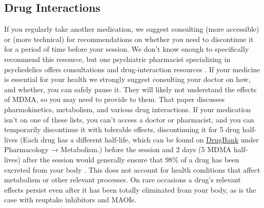 \documentclass[12pt,letterpaper]{book}
\begin{document}
\subsection*{Drug Interactions}
If you regularly take another medication, we suggest consulting \textcite{liechtiInteractions} (more accessible) or \textcite{sarparastDrugInteractions} (more technical) for recommendations on whether you need to discontinue it for a period of time before your session. We don't know enough to specifically recommend this resource, but one psychiatric pharmacist specializing in psychedelics offers consultations and drug-interaction resources \cite{spiritPharmacist}. If your medicine is essential for your health we strongly suggest consulting your doctor on how, and whether, you can safely pause it. They will likely not understand the effects of MDMA, so you may need to provide \textcite{sarparastDrugInteractions} to them. That paper discusses pharmokinetics, metabolism, and various drug interactions. If your medication isn't on one of these lists, you can't access a doctor or pharmacist, and you can temporarily discontinue it with tolerable effects, discontinuing it for 5 drug half-lives (Each drug has a different half-life, which can be found on \href{https://go.drugbank.com}{DrugBank} under Pharmacology → Metabolism.) before the session and 2 days (5 MDMA half-lives) after the session would generally ensure that 98\% of a drug has been excreted from your body \cite{andradeHalf,torrePharmacology}. This does not account for health conditions that affect metabolism or other relevant processes. On rare occasions a drug's relevant effects persist even after it has been totally eliminated from your body, as is the case with reuptake inhibitors and MAOIs.
\end{document}
